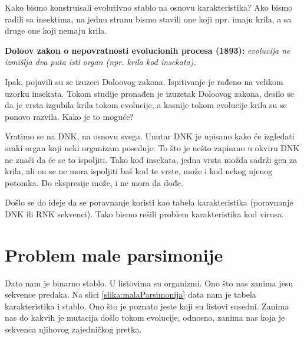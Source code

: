 Kako bismo konstruisali evolutivno stablo na osnovu karakteristika? Ako bismo radili sa insektima, na jednu stranu bismo stavili one koji npr. imaju krila, a sa druge one koji nemaju krila.

\textbf{Doloov zakon o nepovratnosti evolucionih procesa (1893):} \textit{evolucija ne izmi\v{s}lja dva puta isti organ (npr. krila kod insekata).}

Ipak, pojavili su se izuzeci Doloovog zakona. Ispitivanje je rađeno na velikom uzorku insekata. Tokom studije pronađen je izuzetak Doloovog zakona, desilo se da je vrsta izgubila krila tokom evolucije, a kasnije tokom evolucije krila su se ponovo razvila. Kako je to moguće?

Vratimo se na DNK, na osnovu svega. Unutar DNK je upisano kako će izgledati svaki organ koji neki organizam poseduje. To što je nešto zapisano u okviru DNK ne znači da će se to ispoljiti. Tako kod insekata, jedna vrsta možda sadrži gen za krila, ali on se ne mora ispoljiti baš kod te vrste, može i kod nekog njenog potomka. Do ekspresije može, i ne mora da dođe. 


Došlo se do ideje da se poravnanje koristi kao tabela karakteristika (poravnanje DNK ili RNK sekvenci). Tako bismo rešili problem karakteristika kod virusa.

\section{Problem male parsimonije}
\label{sec:pmp}

Dato nam je binarno stablo. U listovima su organizmi. Ono što nas zanima jesu sekvence predaka. Na slici \ref{slika:malaParsimonija} data nam je tabela karakteristika i stablo. Ono što je poznato jeste koji su listovi susedni. Zanima nas do kakvih je mutacija došlo tokom evolucije, odnosno, zanima nas koja je sekvenca njihovog zajedničkog pretka. 

